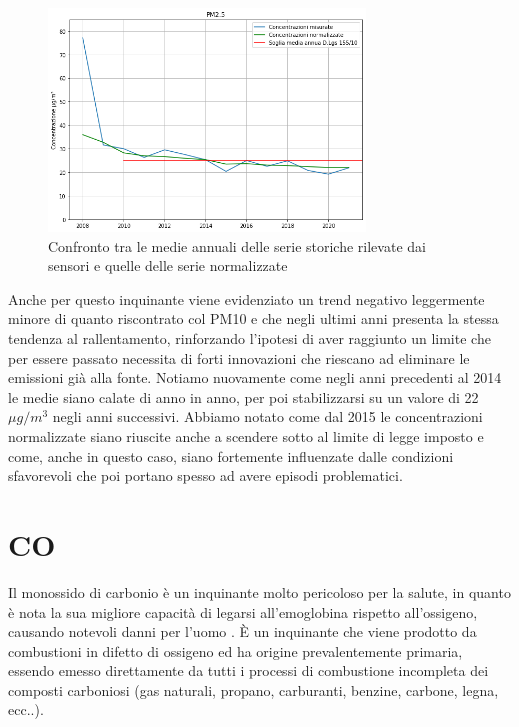 \begin{figure}[h]
\centering
\includegraphics[width=0.75\textwidth]{pm25_medie_annuali}
\caption{Confronto tra le medie annuali delle serie storiche rilevate dai sensori e quelle delle serie normalizzate}
\label{fig:pm25_medie_annuali}
\end{figure}

Anche per questo inquinante viene evidenziato un trend negativo leggermente minore di quanto riscontrato col PM10 e che negli ultimi anni presenta la stessa tendenza al rallentamento, rinforzando l'ipotesi
di aver raggiunto un limite che per essere passato necessita di forti innovazioni che riescano ad eliminare le emissioni già alla fonte. Notiamo nuovamente come negli anni precedenti al 2014 le medie siano calate di anno in anno, per poi stabilizzarsi su un valore di 22$\mu g/m^3$ negli anni successivi.
Abbiamo notato come dal 2015 le concentrazioni normalizzate siano riuscite anche a scendere sotto al limite di legge imposto e come, anche in questo caso, siano fortemente influenzate dalle condizioni sfavorevoli che poi portano spesso ad avere episodi problematici.


\section{CO}
Il monossido di carbonio è un inquinante molto pericoloso per la salute, in quanto è nota la sua migliore capacità di legarsi all'emoglobina rispetto all'ossigeno, causando notevoli danni per l'uomo \cite{kao2005carbon}.
È un inquinante che viene prodotto da combustioni in difetto di ossigeno ed ha origine prevalentemente primaria, essendo emesso direttamente da tutti i processi di combustione incompleta dei composti carboniosi (gas naturali, propano, carburanti, benzine, carbone, legna, ecc..).

